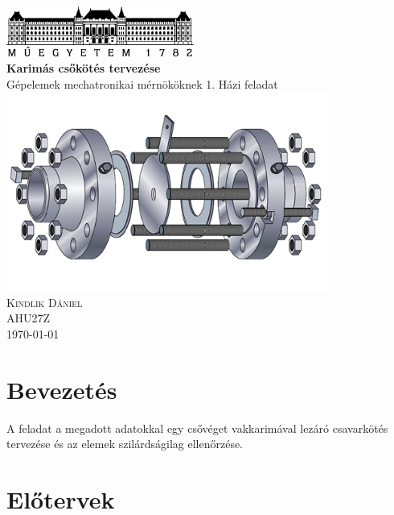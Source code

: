 \documentclass[10pt, a4paper]{article}
\begin{document}
	\begin{titlepage}
		\centering
		\includegraphics[width=175pt]{ BMElogo.png } \\
		\vspace*{2cm}
		{\Huge \bfseries Karimás csőkötés tervezése} \\
		\vspace{0.5cm}
		{\Large Gépelemek mechatronikai mérnököknek 1. Házi feladat} \\
		\vspace{0.5cm}
		\includegraphics[width=300pt, angle=-90]{ karima_rajz.png } \\
		\vspace{1cm}
		{\Large \scshape Kindlik Dániel} \\
		\vspace{0.5cm}
		AHU27Z \\
		\vfill
		{\large \today} \\
	\end{titlepage}
	\thispagestyle{empty}
	\tableofcontents
	\newpage
	\setcounter{page}{3}
	\section*{Bevezetés}
	A feladat a megadott adatokkal egy csővéget vakkarimával lezáró csavarkötés tervezése és az elemek szilárdságilag
	ellenőrzése.
	\section{Előtervek}
\end{document}
